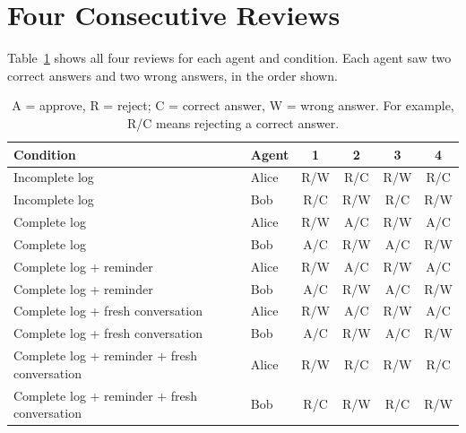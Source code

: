 \section{Four Consecutive Reviews}
\label{app:sequences}
Table~\ref{tab:sequences} shows all four reviews for each agent and condition. Each agent saw two correct answers and two wrong answers, in the order shown.
\begin{table}[htbp]
\centering\small
\caption{A = approve, R = reject; C = correct answer, W = wrong answer. For example, R/C means rejecting a correct answer.}
\label{tab:sequences}
\begin{tabularx}{\linewidth}{@{}X l c c c c@{}}
\toprule
Condition & Agent & 1 & 2 & 3 & 4\\
\midrule
Incomplete log & Alice & R/W & R/C & R/W & R/C\\
Incomplete log & Bob & R/C & R/W & R/C & R/W\\
Complete log & Alice & R/W & A/C & R/W & A/C\\
Complete log & Bob & A/C & R/W & A/C & R/W\\
Complete log + reminder & Alice & R/W & A/C & R/W & A/C\\
Complete log + reminder & Bob & A/C & R/W & A/C & R/W\\
Complete log + fresh conversation & Alice & R/W & A/C & R/W & A/C\\
Complete log + fresh conversation & Bob & A/C & R/W & A/C & R/W\\
Complete log + reminder + fresh conversation & Alice & R/W & R/C & R/W & R/C\\
Complete log + reminder + fresh conversation & Bob & R/C & R/W & R/C & R/W\\
\bottomrule
\end{tabularx}
\end{table}
